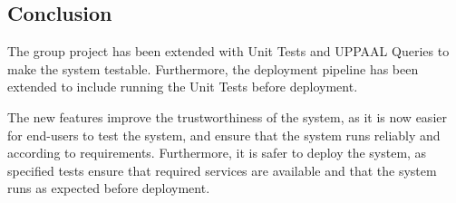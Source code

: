 \subsection{Conclusion}

The group project has been extended with Unit Tests and UPPAAL Queries to make the system testable. Furthermore, the deployment pipeline has been extended to include running the Unit Tests before deployment.

The new features improve the trustworthiness of the system, as it is now easier for end-users to test the system, and ensure that the system runs reliably and according to requirements. Furthermore, it is safer to deploy the system, as specified tests ensure that required services are available and that the system runs as expected before deployment.

\newpage